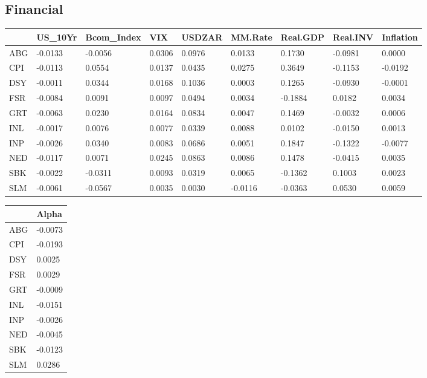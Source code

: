 \documentclass[11pt,preprint, authoryear]{elsarticle}
\let\origtable\table
\let\endorigtable\endtable
\renewenvironment{table}[1][2] {
    \expandafter\origtable\expandafter[H]
} {
    \endorigtable
}
\numberwithin{equation}{section}
\numberwithin{figure}{section}
\numberwithin{table}{section}
\begin{document}
\hypertarget{financial}{%
\subsection{Financial}\label{financial}}

\begin{table}[H]

\caption{\label{tab:Beta_F}Factor Beta's: Financial}
\centering
\begin{tabular}[t]{l|l|l|l|l|l|l|l|l}
\hline
  & US\_10Yr & Bcom\_Index & VIX & USDZAR & MM.Rate & Real.GDP & Real.INV & Inflation\\
\hline
ABG & -0.0133 & -0.0056 & 0.0306 & 0.0976 & 0.0133 & 0.1730 & -0.0981 & 0.0000\\
\hline
CPI & -0.0113 & 0.0554 & 0.0137 & 0.0435 & 0.0275 & 0.3649 & -0.1153 & -0.0192\\
\hline
DSY & -0.0011 & 0.0344 & 0.0168 & 0.1036 & 0.0003 & 0.1265 & -0.0930 & -0.0001\\
\hline
FSR & -0.0084 & 0.0091 & 0.0097 & 0.0494 & 0.0034 & -0.1884 & 0.0182 & 0.0034\\
\hline
GRT & -0.0063 & 0.0230 & 0.0164 & 0.0834 & 0.0047 & 0.1469 & -0.0032 & 0.0006\\
\hline
INL & -0.0017 & 0.0076 & 0.0077 & 0.0339 & 0.0088 & 0.0102 & -0.0150 & 0.0013\\
\hline
INP & -0.0026 & 0.0340 & 0.0083 & 0.0686 & 0.0051 & 0.1847 & -0.1322 & -0.0077\\
\hline
NED & -0.0117 & 0.0071 & 0.0245 & 0.0863 & 0.0086 & 0.1478 & -0.0415 & 0.0035\\
\hline
SBK & -0.0022 & -0.0311 & 0.0093 & 0.0319 & 0.0065 & -0.1362 & 0.1003 & 0.0023\\
\hline
SLM & -0.0061 & -0.0567 & 0.0035 & 0.0030 & -0.0116 & -0.0363 & 0.0530 & 0.0059\\
\hline
\end{tabular}
\end{table}

\begin{table}[H]

\caption{\label{tab:Alpha_F}Factor Alpha's: Financial}
\centering
\begin{tabular}[t]{l|l}
\hline
  & Alpha\\
\hline
ABG & -0.0073\\
\hline
CPI & -0.0193\\
\hline
DSY & 0.0025\\
\hline
FSR & 0.0029\\
\hline
GRT & -0.0009\\
\hline
INL & -0.0151\\
\hline
INP & -0.0026\\
\hline
NED & -0.0045\\
\hline
SBK & -0.0123\\
\hline
SLM & 0.0286\\
\hline
\end{tabular}
\end{table}
\end{document}
